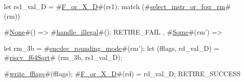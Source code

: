 let rs1_val_D = #\hyperref[sailRISCVzFzyorzyXzyD]{F\_or\_X\_D}#(rs1);
match (#\hyperref[sailRISCVzselectzyinstrzyorzyfcsrzyrm]{select\_instr\_or\_fcsr\_rm}# (rm)) {
  #\hyperref[sailRISCVzNone]{None}#() => { #\hyperref[sailRISCVzhandlezyillegal]{handle\_illegal}#(); RETIRE_FAIL },
  #\hyperref[sailRISCVzSome]{Some}#(rm') => {
    let rm_3b = #\hyperref[sailRISCVzencdeczyroundingzymode]{encdec\_rounding\_mode}#(rm');
    let (fflags, rd_val_D) = #\hyperref[sailRISCVzriscvzyf64Sqrt]{riscv\_f64Sqrt}#   (rm_3b, rs1_val_D);

    #\hyperref[sailRISCVzwritezyfflags]{write\_fflags}#(fflags);
    #\hyperref[sailRISCVzFzyorzyXzyD]{F\_or\_X\_D}#(rd) = rd_val_D;
    RETIRE_SUCCESS
  }
}
